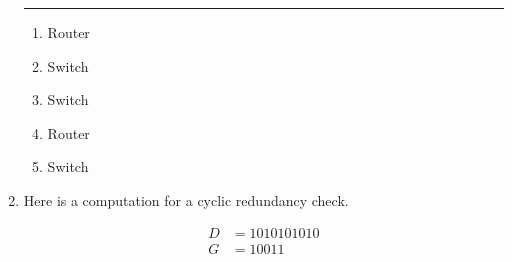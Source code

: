 \documentclass[twoside]{article}
\newenvironment{answer}
  {\vspace*{0.2cm} \rule{12cm}{0.04cm} \vspace*{0.2cm}}
  {\vspace*{0.2cm}}
\begin{document}
\begin{enumerate}
  \begin{answer}

  \begin{enumerate}
    \item Router
    \item Switch
    \item Switch
    \item Router
    \item Switch
    \end{enumerate}

    \end{answer}

  \item Here is a computation for a cyclic redundancy check.

  \begin{align*}
    D & = 1010101010 \\
    G & = 10011
    \end{align*}


\end{enumerate}
\end{document}
